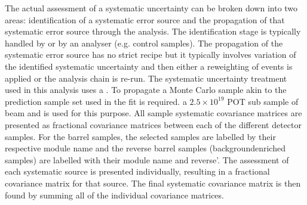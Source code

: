 \newline
\newline
The actual assessment of a systematic uncertainty can be broken down into two areas: identification of a systematic error source and the propagation of that systematic error source through the analysis.  The identification stage is typically handled by  or by an analyser   (e.g. control samples).  The propagation of the systematic error source has no strict recipe but it typically involves variation of the identified systematic uncertainty and then either a reweighting of events is applied or the analysis chain is re-run.  The systematic uncertainty treatment used in this analysis uses a .
\newline
\newline
To propagate  a Monte Carlo sample akin to the prediction sample set used in the fit is required.   a $2.5\times10^{19}$ POT sub sample of beam and  is used for this purpose.  All sample systematic covariance matrices are presented as fractional covariance matrices between each of the different detector samples.  For the barrel samples, the selected samples are labelled by their respective module name and the reverse barrel samples (backgroundenriched samples) are labelled with their module name and reverse'.  The assessment of each systematic source is presented individually, resulting in a fractional covariance matrix for that source.  The final systematic covariance matrix is then found by summing all of the individual covariance matrices.
